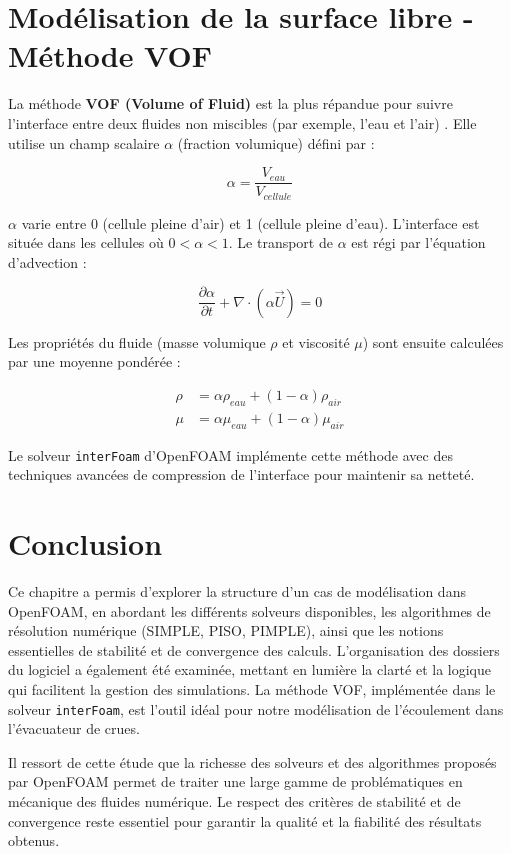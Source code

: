 \section{Modélisation de la surface libre - Méthode VOF}
\label{sec:vof}

La méthode \textbf{VOF (Volume of Fluid)} est la plus répandue pour suivre l'interface entre deux fluides non miscibles (par exemple, l'eau et l'air) \cite{hirt1981volume}. Elle utilise un champ scalaire \(\alpha\) (fraction volumique) défini par :

\begin{equation}
\alpha = \frac{V_{eau}}{V_{cellule}}
\label{eq:vof_alpha}
\end{equation}

\(\alpha\) varie entre 0 (cellule pleine d'air) et 1 (cellule pleine d'eau). L'interface est située dans les cellules où \(0 < \alpha < 1\). Le transport de \(\alpha\) est régi par l'équation d'advection \cite{rider1998reconstructing} :

\begin{equation}
\frac{\partial \alpha}{\partial t} + \nabla \cdot (\alpha \vec{U}) = 0
\label{eq:vof_transport}
\end{equation}

Les propriétés du fluide (masse volumique \(\rho\) et viscosité \(\mu\)) sont ensuite calculées par une moyenne pondérée \cite{scardovelli1999direct} :

\begin{align}
\rho &= \alpha \rho_{eau} + (1-\alpha)\rho_{air} \label{eq:vof_rho} \\
\mu &= \alpha \mu_{eau} + (1-\alpha)\mu_{air} \label{eq:vof_mu}
\end{align}

Le solveur \texttt{interFoam} d'OpenFOAM implémente cette méthode avec des techniques avancées de compression de l'interface pour maintenir sa netteté.

\section{Conclusion}
\label{sec:conclusion_openfoam}

Ce chapitre a permis d'explorer la structure d'un cas de modélisation dans OpenFOAM, en abordant les différents solveurs disponibles, les algorithmes de résolution numérique (SIMPLE, PISO, PIMPLE), ainsi que les notions essentielles de stabilité et de convergence des calculs. L'organisation des dossiers du logiciel a également été examinée, mettant en lumière la clarté et la logique qui facilitent la gestion des simulations. La méthode VOF, implémentée dans le solveur \texttt{interFoam}, est l'outil idéal pour notre modélisation de l'écoulement dans l'évacuateur de crues.

Il ressort de cette étude que la richesse des solveurs et des algorithmes proposés par OpenFOAM permet de traiter une large gamme de problématiques en mécanique des fluides numérique. Le respect des critères de stabilité et de convergence reste essentiel pour garantir la qualité et la fiabilité des résultats obtenus.
